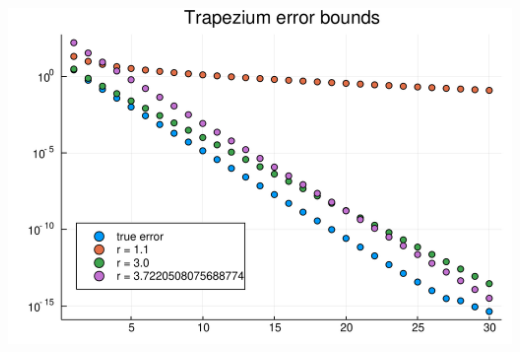 \documentclass[12pt,a4paper]{article}
\begin{document}
\includegraphics[width=\linewidth]{figures/Solutions1_32_1.pdf}
\end{document}
